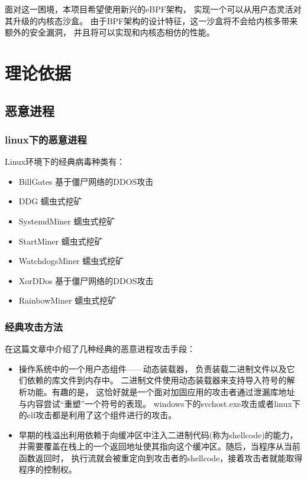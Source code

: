 \documentclass[AutoFakeBold,a4paper]{ctexart}
\begin{document}
面对这一困境，本项目希望使用新兴的eBPF架构，
实现一个可以从用户态灵活对其升级的内核态沙盒。
由于BPF架构的设计特征，这一沙盒将不会给内核多带来额外的安全漏洞，
并且将可以实现和内核态相仿的性能。

\section{理论依据}

\subsection{恶意进程}

\subsubsection{linux下的恶意进程}

Linux环境下的经典病毒种类有：\cite{LinuxVirus2020}

\begin{itemize}
    \item BillGates 基于僵尸网络的DDOS攻击
    \item DDG 蠕虫式挖矿
    \item SystemdMiner 蠕虫式挖矿
    \item StartMiner 蠕虫式挖矿
    \item WatchdogsMiner 蠕虫式挖矿
    \item XorDDos 基于僵尸网络的DDOS攻击
    \item RainbowMiner 蠕虫式挖矿
\end{itemize}


\subsubsection{经典攻击方法}

在这篇文章\cite{di2015elf}中介绍了几种经典的恶意进程攻击手段：

\begin{itemize}
    \item 操作系统中的一个用户态组件——动态装载器，
    负责装载二进制文件以及它们依赖的库文件到内存中。
    二进制文件使用动态装载器来支持导入符号的解析功能。有趣的是，
    这恰好就是一个面对加固应用的攻击者通过泄漏库地址与内容尝试“重塑”一个符号的表现。
    windows下的svchost.exe攻击或者linux下的elf攻击都是利用了这个组件进行的攻击。
    \item 早期的栈溢出利用依赖于向缓冲区中注入二进制代码(称为shellcode)的能力，
    并需要覆盖在栈上的一个返回地址使其指向这个缓冲区。随后，当程序从当前函数返回时，
    执行流就会被重定向到攻击者的shellcode，接着攻击者就能取得程序的控制权。
    
\end{itemize}
\end{document}
